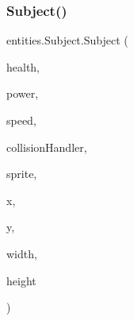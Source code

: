 \subsubsection{\texorpdfstring{Subject()}{Subject()}\hspace{0.1cm}{\footnotesize\ttfamily [2/2]}}
{\footnotesize\ttfamily entities.\+Subject.\+Subject (\begin{DoxyParamCaption}\item[{int}]{health,  }\item[{int}]{power,  }\item[{float}]{speed,  }\item[{\mbox{\hyperlink{classentities_1_1_collision_handler}{Collision\+Handler}}}]{collision\+Handler,  }\item[{\mbox{\hyperlink{classorg_1_1newdawn_1_1slick_1_1_image}{Image}}}]{sprite,  }\item[{float}]{x,  }\item[{float}]{y,  }\item[{float}]{width,  }\item[{float}]{height }\end{DoxyParamCaption})\hspace{0.3cm}{\ttfamily [inline]}}


